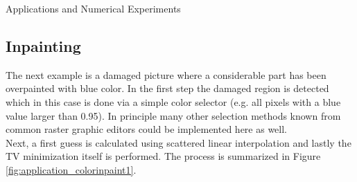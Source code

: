 \begin{chapter}{Applications and Numerical Experiments}
\FloatBarrier
\subsection{Inpainting} %
The next example is a damaged picture where a considerable part has been overpainted with blue color. In the first step the damaged region is detected which in this
case is done via a simple color selector (e.g. all pixels with a blue value larger than 0.95). In principle many other selection methods known from common raster graphic editors
could be implemented here as well. \\
Next, a first guess is calculated using scattered linear interpolation and lastly the TV minimization itself is performed. The process is summarized in Figure 
\ref{fig:application_colorinpaint1}.


\end{chapter}
